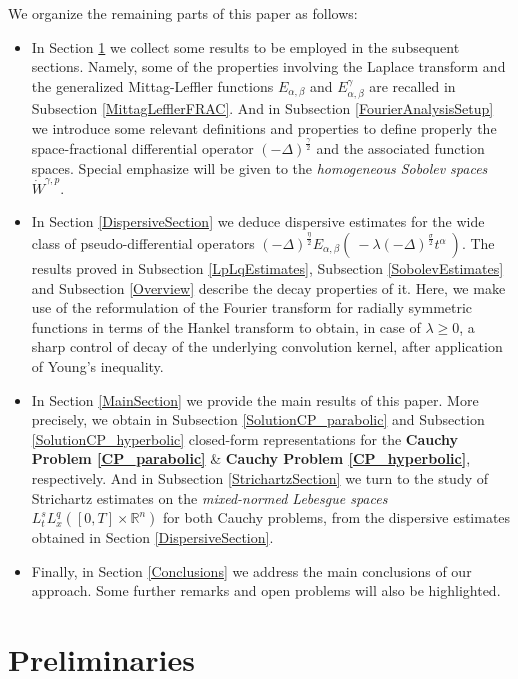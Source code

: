\documentclass{amsart}
\theoremstyle{definition}
\theoremstyle{remark}
\numberwithin{equation}{section}
\newcommand{\BR}{{\mathbb R}}
\begin{document}
We organize the remaining parts of this paper as follows:
\begin{itemize}
	\item In Section \ref{Preliminaries} we collect some results to be employed in the subsequent sections. Namely, some of the properties involving the Laplace transform and the generalized Mittag-Leffler functions $E_{\alpha,\beta}$ and $E_{\alpha,\beta}^\gamma$ are recalled in Subsection \ref{MittagLefflerFRAC}. And in Subsection \ref{FourierAnalysisSetup} we introduce some relevant definitions and properties to define properly the space-fractional differential operator $(-\Delta)^{\frac{\gamma}{2}}$ and the associated function spaces. Special emphasize will be given to the {\it homogeneous Sobolev spaces} $\dot{W}^{\gamma,p}$.
	\item In Section {\ref{DispersiveSection}} we deduce dispersive estimates for the wide class of pseudo-differential operators $(-\Delta)^{\frac{\eta}{2}}E_{\alpha,\beta}\left(~-\lambda(-\Delta)^{\frac{\sigma}{2}} t^\alpha~\right)$. The results proved in Subsection \ref{LpLqEstimates}, Subsection \ref{SobolevEstimates} and Subsection \ref{Overview} describe the decay properties of it. Here, we make use of the reformulation of the Fourier transform for radially symmetric functions in terms of the Hankel transform to obtain, in case of $\lambda\geq 0$, a sharp control of decay of the underlying convolution kernel, after application of Young's inequality. 
	\item
	In Section \ref{MainSection} we provide the main results of this paper. More precisely, we obtain in Subsection \ref{SolutionCP_parabolic} and Subsection \ref{SolutionCP_hyperbolic} closed-form representations for the {\bf Cauchy Problem \ref{CP_parabolic}} \& {\bf Cauchy Problem \ref{CP_hyperbolic}}, respectively. And in Subsection \ref{StrichartzSection} we turn to the study of Strichartz estimates on the {\it mixed-normed Lebesgue spaces} $L_t^sL_x^q([0,T]\times \BR^n)$ for both Cauchy problems, from the dispersive estimates obtained in Section \ref{DispersiveSection}.
	\item Finally, in Section \ref{Conclusions} we address the main conclusions of our approach. Some further remarks and open problems will also be highlighted.
\end{itemize}


\section{Preliminaries}\label{Preliminaries}
\end{document}

